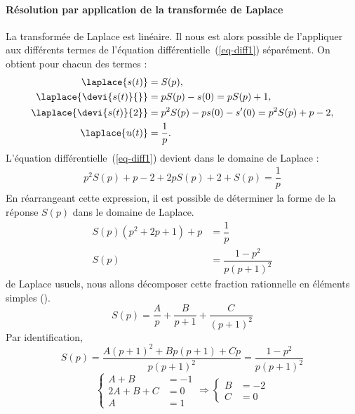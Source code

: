 \paragraph{Résolution par application de la transformée de Laplace}
La transformée de Laplace est linéaire. Il nous est alors possible
de l'appliquer aux différents termes de l'équation 
différentielle~(\ref{eq-diff1}) séparément.
On obtient pour chacun des termes :
\begin{align*}
    \laplace{s(t)} &= S(p), \\
    \laplace{\devi{s(t)}{}} &= pS(p)-s(0) = pS(p) +1, \\
    \laplace{\devi{s(t)}{2}} &= p^2S(p)-ps(0)-s'(0) = p^2S(p) + p -2,\\
    \laplace{u(t)} &= \dfrac{1}{p}.
\end{align*}
\newpage
\restoregeometry
\captionsetup{width=0.9\linewidth,labelfont=bf}
L'équation différentielle~(\ref{eq-diff1}) devient dans le domaine 
de Laplace :
\begin{align*}
p^2S(p)+p-2+2pS(p)+2+S(p)=\dfrac{1}{p} 
\end{align*}
En réarrangeant cette expression, il est possible de déterminer la 
forme de la réponse $S(p)$ dans le domaine de Laplace.
\begin{align*}
    S(p)\left(p^2+2p+1\right)+p&=\dfrac{1}{p} \\
    S(p)&= \dfrac{1-p^2}{p\left(p+1\right)^2}
\end{align*}
de Laplace usuels, nous allons décomposer cette
fraction rationnelle en éléments simples ().
\[
    S(p)=\dfrac{A}{p}+\dfrac{B}{p+1}+\dfrac{C}{(p+1)^2}
\]
Par identification, 
\[
    S(p)=\dfrac{A(p+1)^2+Bp(p+1)+Cp}{p(p+1)^2}
        =\dfrac{1-p^2}{p\left(p+1\right)^2}
\]
\[
\begin{cases}
    A+B&=-1 \\
    2A+B+C&=0 \\
    A&=1   
\end{cases}\Rightarrow
\begin{cases}
    B&=-2\\
    C&=0
\end{cases}
\]
